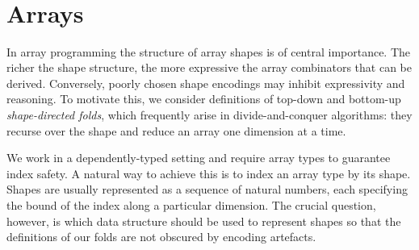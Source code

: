 \begin{code}[hide]
\AgdaSpace{}%
\AgdaSpace{}%
\AgdaSpace{}%
\AgdaSpace{}%
\AgdaSpace{}%
\AgdaSpace{}%
\AgdaSpace{}%
\AgdaSpace{}%
\AgdaSpace{}%
\<%
\\
\>[0]\AgdaSpace{}%
\AgdaSymbol{=}\AgdaSpace{}%
\<%
\\
%
\\[\AgdaEmptyExtraSkip]%
\>[0]\AgdaSpace{}%
\<%
\\
\>[0][@{}l@{\AgdaIndent{0}}]%
\>[2]\AgdaSpace{}%
\AgdaSpace{}%
\AgdaSpace{}%
\AgdaSymbol{:}\AgdaSpace{}%
\<%
\\
%
\>[2]\AgdaSpace{}%
\AgdaSpace{}%
\AgdaSymbol{:}\AgdaSpace{}%
\<%
\\
\>[0]\<%
\end{code}
\section{Arrays\label{sec:arrays}}
In array programming the structure of array shapes is of central importance.
The richer the shape structure, the more expressive the array combinators that
can be derived.  Conversely, poorly chosen shape encodings may inhibit
expressivity and reasoning.  To motivate this, we consider definitions of
top-down and bottom-up \emph{shape-directed folds}, which frequently arise in
divide-and-conquer algorithms: they recurse over the shape and reduce an array
one dimension at a time.

We work in a dependently-typed setting and require array types to guarantee
index safety. A natural way to achieve this is to index an array type by its
shape. Shapes are usually represented as a sequence of natural numbers, each
specifying the bound of the index along a particular dimension. The crucial
question, however, is which data structure should be used to represent shapes
so that the definitions of our folds are not obscured by
encoding artefacts.

